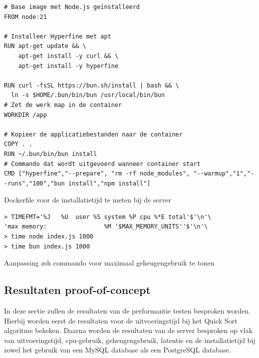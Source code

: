 \begin{listing}[H]
  \centering
  \begin{verbatim}
# Base image met Node.js geïnstalleerd
FROM node:21

# Installeer Hyperfine met apt
RUN apt-get update && \
    apt-get install -y curl && \
    apt-get install -y hyperfine

RUN curl -fsSL https://bun.sh/install | bash && \
  ln -s $HOME/.bun/bin/bun /usr/local/bin/bun
# Zet de werk map in de container
WORKDIR /app

# Kopieer de applicatiebestanden naar de container
COPY . .
RUN ~/.bun/bin/bun install
# Commando dat wordt uitgevoerd wanneer container start
CMD ["hyperfine","--prepare", "rm -rf node_modules", "--warmup","1","--runs","100","bun install","npm install"]
      \end{verbatim}
      \caption{\label{code:dockerinstall}Dockerfile voor de installatietijd te meten bij de server}
\end{listing}

\begin{listing}[H]
  \centering
  \begin{verbatim}
> TIMEFMT='%J   %U  user %S system %P cpu %*E total'$'\n'\
'max memory:                %M '$MAX_MEMORY_UNITS''$'\n'\
> time node index.js 1000
> time bun index.js 1000
      \end{verbatim}
      \caption{\label{code:zshmemory}Aanpassing zsh commando voor maximaal geheugengebruik te tonen}
\end{listing}

\subsection{Resultaten proof-of-concept}
In deze sectie zullen de resultaten van de performantie testen besproken worden.
Hierbij worden eerst de resultaten voor de uitvoeringstijd bij het Quick Sort algoritme bekeken.
Daarna worden de resultaten van de server besproken op vlak van uitvoeringstijd, cpu-gebruik, geheugengebruik, latentie en de installatietijd 
bij zowel het gebruik van een MySQL database als een PostgreSQL database.

